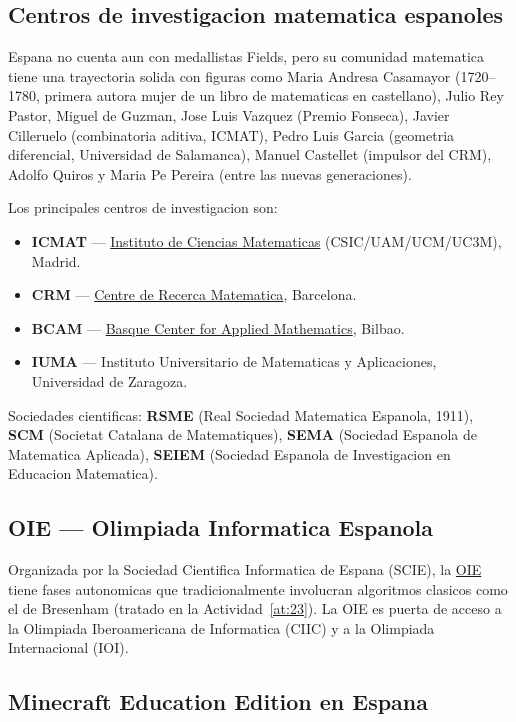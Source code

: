 \documentclass[12pt,a4paper]{scrartcl}
\newcommand{\acc}[1]{\textcolor{accent}{\textbf{#1}}}
\begin{document}
\subsection{Centros de investigacion matematica espanoles}

Espana no cuenta aun con medallistas Fields, pero su comunidad matematica tiene una trayectoria solida con figuras como Maria Andresa Casamayor (1720--1780, primera autora mujer de un libro de matematicas en castellano), Julio Rey Pastor, Miguel de Guzman, Jose Luis Vazquez (Premio Fonseca), Javier Cilleruelo (combinatoria aditiva, ICMAT), Pedro Luis Garcia (geometria diferencial, Universidad de Salamanca), Manuel Castellet (impulsor del CRM), Adolfo Quiros y Maria Pe Pereira (entre las nuevas generaciones).

Los principales centros de investigacion son:
\begin{itemize}[leftmargin=1.3em,itemsep=0.15em,topsep=0.3em,nosep]
  \item \acc{ICMAT} --- \href{https://www.icmat.es/}{Instituto de Ciencias Matematicas} (CSIC/UAM/UCM/UC3M), Madrid.
  \item \acc{CRM} --- \href{https://www.crm.cat/}{Centre de Recerca Matematica}, Barcelona.
  \item \acc{BCAM} --- \href{https://www.bcamath.org/}{Basque Center for Applied Mathematics}, Bilbao.
  \item \acc{IUMA} --- Instituto Universitario de Matematicas y Aplicaciones, Universidad de Zaragoza.
\end{itemize}

Sociedades cientificas: \acc{RSME} (Real Sociedad Matematica Espanola, 1911), \acc{SCM} (Societat Catalana de Matematiques), \acc{SEMA} (Sociedad Espanola de Matematica Aplicada), \acc{SEIEM} (Sociedad Espanola de Investigacion en Educacion Matematica).

\subsection{OIE --- Olimpiada Informatica Espanola}

Organizada por la Sociedad Cientifica Informatica de Espana (SCIE), la \href{https://olimpiada-informatica.org/}{OIE} tiene fases autonomicas que tradicionalmente involucran algoritmos clasicos como el de Bresenham (tratado en la Actividad~\ref{at:23}). La OIE es puerta de acceso a la Olimpiada Iberoamericana de Informatica (CIIC) y a la Olimpiada Internacional (IOI).

\subsection{Minecraft Education Edition en Espana}\label{sec:mee}
\end{document}
